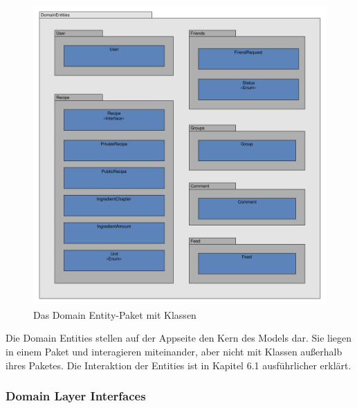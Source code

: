 \begin{figure}[H]
	\centering
	\includegraphics[width=\textwidth]{pics/EntityPackage.pdf}%
	\caption{Das Domain Entity-Paket mit Klassen}%
	\label{domain}%
\end{figure}

Die Domain Entities stellen auf der Appseite den Kern des Models dar. Sie liegen in einem Paket und interagieren miteinander, aber nicht mit Klassen außerhalb ihres Paketes. Die Interaktion der Entities ist in Kapitel 6.1 ausführlicher erklärt.

\subsubsection{Domain Layer Interfaces}


